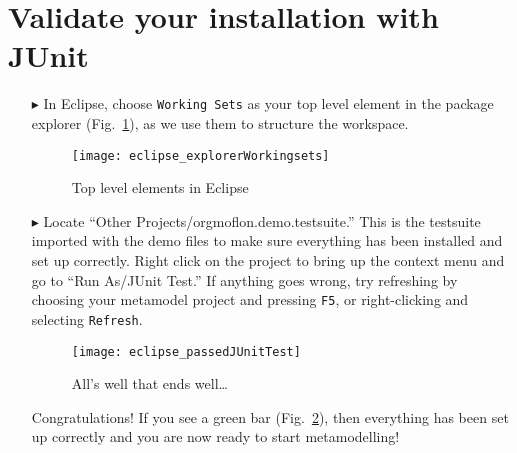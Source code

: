 \clearpage
\genHeader
\hypertarget{validate common}{} 
\section{Validate your installation with JUnit}

\begin{itemize}

\item[$\blacktriangleright$] In Eclipse, choose \texttt{Working Sets} as your top level element in the package explorer (Fig.~\ref{eclipse:topLevel}), as we use
them to structure the workspace.

\begin{figure}[htbp]
	\centering
  \texttt{[image: eclipse\_explorerWorkingsets]}
	\caption{Top level elements in Eclipse}
	\label{eclipse:topLevel}
\end{figure}

\item[$\blacktriangleright$] Locate ``Other Projects/orgmoflon.demo.testsuite.'' This is the testsuite imported with the demo files to make sure everything has been installed and
set up correctly. Right click on the project to bring up the context menu and go to ``Run As/JUnit Test.'' If anything goes wrong, try refreshing by choosing
your metamodel project and pressing  \texttt{F5}, or right-clicking and selecting \texttt{Refresh}.

\vspace{0.5cm}

\begin{figure}[htbp]
	\centering
  \texttt{[image: eclipse\_passedJUnitTest]}
	\caption{All's well that ends well\ldots}
	\label{eclipse:passedTest}
\end{figure}

\vspace{0.5cm}

Congratulations!  If you see a green bar  (Fig.~\ref{eclipse:passedTest}), then everything has been set up correctly and you are now ready to start
metamodelling!

\end{itemize}